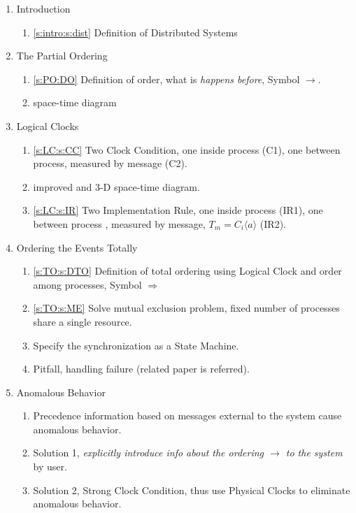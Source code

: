 \documentclass[12pt,a4paper,oneside]{article}
\begin{document}
\begin{enumerate}
  \item Introduction
  \begin{enumerate}
    \item \ref{s:intro:s:dist} Definition of Distributed Systems
  \end{enumerate}
  \item The Partial Ordering
  \begin{enumerate}
      \item \ref{s:PO:DO} Definition of order, what is \textit{happens before}, Symbol $\rightarrow$. %
      \item space-time diagram
  \end{enumerate}
  \item Logical Clocks
  \begin{enumerate}
      \item \ref{s:LC:s:CC} Two Clock Condition, one inside process (C1), one between process, measured by message (C2).
      \item improved and 3-D space-time diagram.
      \item \ref{s:LC:s:IR} Two Implementation Rule, one inside process (IR1), one between process , measured by message, $T_m = C_i\langle a \rangle$ (IR2).
  \end{enumerate}
  \item Ordering the Events Totally
  \begin{enumerate}
      \item \ref{s:TO:s:DTO} Definition of total ordering using Logical Clock and order among processes, Symbol $\Rightarrow$
      \item \ref{s:TO:s:ME} Solve mutual exclusion problem, fixed number of processes share a single resource.
      \item Specify the synchronization as a State Machine.
      \item Pitfall, handling failure (related paper is referred).
  \end{enumerate}
  \item Anomalous Behavior
  \begin{enumerate}
      \item Precedence information based on messages external to the system cause anomalous behavior.
      \item Solution 1, \textit{explicitly introduce info about the ordering $\rightarrow$ to the system} by user.
      \item Solution 2, Strong Clock Condition, thus use Physical Clocks to eliminate anomalous behavior.

\end{enumerate}
\end{enumerate}
\end{document}
